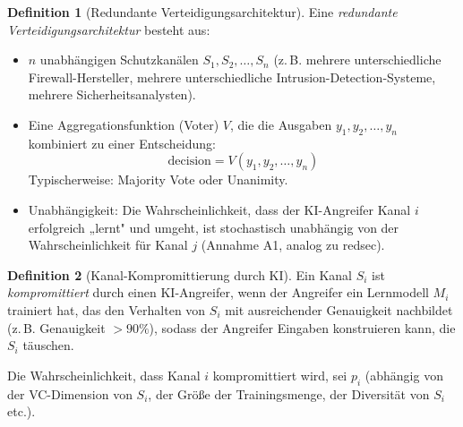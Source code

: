 \documentclass[a4paper,12pt]{article}
\theoremstyle{definition}
\newtheorem{definition}{Definition}
\begin{document}
\begin{definition}[Redundante Verteidigungsarchitektur]
\label{def:redundante_verteidigung}
Eine \emph{redundante Verteidigungsarchitektur} besteht aus:
\begin{itemize}
	\item $n$ unabhängigen Schutzkanälen $S_1, S_2, \ldots, S_n$ (z.\,B. mehrere unterschiedliche Firewall-Hersteller, mehrere unterschiedliche Intrusion-Detection-Systeme, mehrere Sicherheitsanalysten).
	\item Eine Aggregationsfunktion (Voter) $V$, die die Ausgaben $y_1, y_2, \ldots, y_n$ kombiniert zu einer Entscheidung: 
	\begin{equation}
	\mathrm{decision} = V(y_1, y_2, \ldots, y_n)
	\end{equation}
	Typischerweise: Majority Vote oder Unanimity.
	\item Unabhängigkeit: Die Wahrscheinlichkeit, dass der KI-Angreifer Kanal $i$ erfolgreich „lernt" und umgeht, ist stochastisch unabhängig von der Wahrscheinlichkeit für Kanal $j$ (Annahme A1, analog zu redsec).
\end{itemize}
\end{definition}

\begin{definition}[Kanal-Kompromittierung durch KI]
\label{def:kanal_kompromittierung}
Ein Kanal $S_i$ ist \emph{kompromittiert} durch einen KI-Angreifer, wenn der Angreifer ein Lernmodell $M_i$ trainiert hat, das den Verhalten von $S_i$ mit ausreichender Genauigkeit nachbildet (z.\,B. Genauigkeit $> 90\%$), sodass der Angreifer Eingaben konstruieren kann, die $S_i$ täuschen.

Die Wahrscheinlichkeit, dass Kanal $i$ kompromittiert wird, sei $p_i$ (abhängig von der VC-Dimension von $S_i$, der Größe der Trainingsmenge, der Diversität von $S_i$ etc.).
\end{definition}
\end{document}

